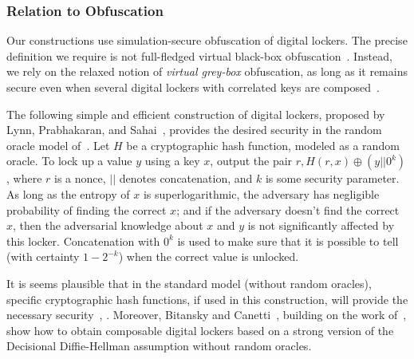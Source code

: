 \documentclass[11pt]{article}
\renewcommand{\paragraph}[1]{\subsubsection{#1}}
\newcommand{\lemref}[1]{\mbox{Lemma~\ref{#1}}}
\begin{document}
\paragraph{Relation to Obfuscation} 
Our constructions use simulation-secure obfuscation of digital lockers. The precise definition we require is not full-fledged virtual black-box obfuscation~\cite{barak2001possibility}. Instead, we rely on the relaxed notion of \emph{virtual grey-box} obfuscation, as long as it remains secure even when several digital lockers with correlated keys are composed~\cite{bitansky2010strong}. 

The following simple and efficient construction of digital lockers, proposed by Lynn, Prabhakaran, and Sahai~\cite[Section 4]{lynn2004positive}, provides the desired security in the random oracle model of~\cite{DBLP:conf/ccs/BellareR93}. Let $H$ be a cryptographic hash function, modeled as a random oracle. To lock up a value $y$ using a key $x$, output the pair $r, H(r, x)\oplus (y||0^k)$, where $r$ is a nonce, $||$ denotes concatenation, and $k$ is some security parameter. As long as the entropy of $x$ is superlogarithmic, the adversary has negligible probability of finding the correct $x$; and if the adversary doesn't find the correct $x$, then the adversarial knowledge about $x$ and $y$ is not significantly affected by this locker.  Concatenation with $0^k$ is used to make sure that it is possible to tell (with certainty $1-2^{-k}$) when the correct value is unlocked. 

It is seems plausible that in the standard model (without random oracles), specific cryptographic hash functions, if used in this construction, will provide the necessary security~\cite[Section 3.2]{canetti2008obfuscating}, \cite[Section 8.2.3]{dakdoukThesis}. 
Moreover, Bitansky and Canetti~\cite{bitansky2010strong}, building on the work of~\cite{canetti2008obfuscating,CKVW10}, show how to obtain composable digital lockers based on a strong version of the Decisional Diffie-Hellman assumption without random oracles.


\end{document}
